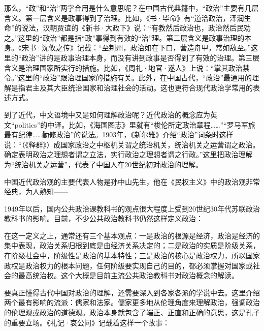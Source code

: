 那么，“政”和“治”两字合用是什么意思呢？在中国古代典籍中，“政治”主要有几层含义。第一层含义是政事得到了治理。比如，《书·毕命》有“道洽政治，泽润生命”的说法，汉朝贾谊的《新书·大政下》说：“有教然后政治也，政治然后民劝之。”这里的“政治”都是指“政”事得到有效的“治”理。第二层含义是政事治理的本身。《宋书·沈攸之传》记载：“至荆州，政治如在下口，营造舟甲，常如敌至。”这里的“政治”讲的是政事治理本身，而没有讲到政事是否得到了有效的治理。第三层含义是治理国家所实行的措施。比如，《周礼·地官·遂人》上说：“掌其政治禁令。”这里的“政治”跟治理国家的措施有关。此外，在中国古代，“政治”最通用的理解是指君主及其大臣统治国家和治理社会的活动。这也更符合现代政治学常用的表述方式。

到了近代，中文语境中又是如何理解政治呢？近代政治的概念应为英文“politics”的中译。比如，《海国图志》里就有“梭伦所定政治章程……”“罗马军旅最有纪律……勤修政治”的说法。1903年，《新尔雅》介绍“政治”词条时这样说：“（《释群》）成国家政治之中枢机关谓之统治机关，统治机关之运营谓之政治。确定表明政治之理想者谓之立法，实行政治之理想者谓之行政。”这里把政治理解为“统治机关之运营”，代表了中国人在20世纪初对政治的理解。

中国近代政治观的主要代表人物是孙中山先生，他在《民权主义》中的政治观非常经典，为人熟知——


1949年以后，国内公共政治课教科书的观点很大程度上受到20世纪30年代苏联政治教科书的影响。目前，不少公共政治教科书仍然这样定义政治：


在这一定义之上，通常还有三个基本观点：一是政治的根源是经济，政治是经济的集中表现，政治关系归根到底是由经济关系决定的；二是政治的实质是阶级关系，在阶级社会中，阶级性是政治的基本特性；三是政治的核心是政治权力，所以国家政权是政治权力的根本问题，任何阶级要实现自己的目的，都必须掌握对国家或社会的最高统治权。这个大概是目前主流公共政治教科书对政治概念的解读。


要真正懂得古代中国对政治的理解，还需要深入到各家各派的学说中去。这里介绍两个最有影响的流派：儒家和法家。儒家更多地从伦理角度来理解政治，强调政治的伦理观或政治的道德观。政治本身就包含了端正、正直和正确的意思，这是孔子的重要立场。《礼记·哀公问》记载着这样一个故事：


